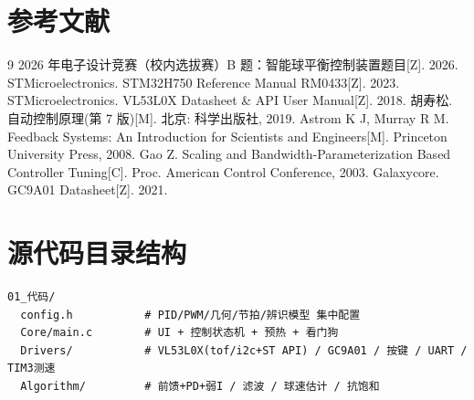 \documentclass[12pt,a4paper]{ctexart}
\begin{document}
\section{参考文献}
\begin{thebibliography}{9}
 2026 年电子设计竞赛（校内选拔赛）B 题：智能球平衡控制装置题目[Z]. 2026.
 STMicroelectronics. STM32H750 Reference Manual RM0433[Z]. 2023.
 STMicroelectronics. VL53L0X Datasheet \& API User Manual[Z]. 2018.
 胡寿松. 自动控制原理(第 7 版)[M]. 北京: 科学出版社, 2019.
 Astrom K J, Murray R M. Feedback Systems: An Introduction for Scientists and Engineers[M]. Princeton University Press, 2008.
 Gao Z. Scaling and Bandwidth-Parameterization Based Controller Tuning[C]. Proc. American Control Conference, 2003.
 Galaxycore. GC9A01 Datasheet[Z]. 2021.
\end{thebibliography}

\appendix
{}
\section{源代码目录结构}
\begin{lstlisting}
01_代码/
  config.h           # PID/PWM/几何/节拍/辨识模型 集中配置
  Core/main.c        # UI + 控制状态机 + 预热 + 看门狗
  Drivers/           # VL53L0X(tof/i2c+ST API) / GC9A01 / 按键 / UART / TIM3测速
  Algorithm/         # 前馈+PD+弱I / 滤波 / 球速估计 / 抗饱和
\end{lstlisting}
\end{document}
